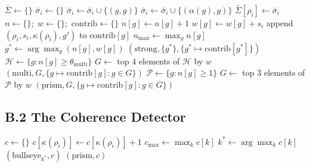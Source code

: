 \documentclass[11pt]{article}
\begin{document}
\begin{algorithm}[H]
\caption{Aggregator}
\begin{algorithmic}[1]
  \State $\bar\Sigma \gets \{\}$  
    \State $\bar\sigma_i \gets \{\}$
        \State $\bar\sigma_i \gets \bar\sigma_i \cup \{ (g, g) \}$  
        \State $\bar\sigma_i \gets \bar\sigma_i \cup \{ (\alpha(g), g) \}$  
      \EndIf  {}
    \EndFor
    \State $\bar\Sigma[\rho_i] \gets \bar\sigma_i$
  \EndFor
  \State $n \gets \{\}$;\ $w \gets \{\}$;\ $\mathrm{contrib} \gets \{\}$
      \State $n[g] \gets n[g] + 1$
      \State $w[g] \gets w[g] + s_i$
      \State append $(\rho_i, s_i, \kappa(\rho_i), g')$ to $\mathrm{contrib}[g]$
    \EndFor
  \EndFor
  \State $n_{\max} \gets \max_{g} n[g]$
    \State $g^{*} \gets \arg\max_{g} (n[g], w[g])$  
    \State \Return $(\mathrm{strong}, \{ g^{*} \}, \{ g^{*} \mapsto \mathrm{contrib}[g^{*}] \})$
  \EndIf
  \State $\mathcal{H} \gets \{ g : n[g] \geq \theta_{\mathrm{multi}} \}$
    \State $G \gets$ top 4 elements of $\mathcal{H}$ by $w$
    \State \Return $(\mathrm{multi}, G, \{ g \mapsto \mathrm{contrib}[g] : g \in G \})$
  \EndIf
  \State $\mathcal{P} \gets \{ g : n[g] \geq 1 \}$
  \State $G \gets$ top 3 elements of $\mathcal{P}$ by $w$
  \State \Return $(\mathrm{prism}, G, \{ g \mapsto \mathrm{contrib}[g] : g \in G \})$
\EndFunction
\end{algorithmic}
\end{algorithm}

\subsection*{B.2 The Coherence Detector}

\begin{algorithm}[H]
\caption{Coherence Detector}
\begin{algorithmic}[1]
  \State $c \gets \{\}$
    \State $c[\kappa(\rho_i)] \gets c[\kappa(\rho_i)] + 1$
  \EndFor
  \State $c_{\max} \gets \max_{k} c[k]$
    \State $k^{*} \gets \arg\max_{k} c[k]$
    \State \Return $(\mathrm{bullseye}_{k^{*}}, c)$
  \EndIf
  \State \Return $(\mathrm{prism}, c)$
\EndFunction
\end{algorithmic}
\end{algorithm}
\end{document}
